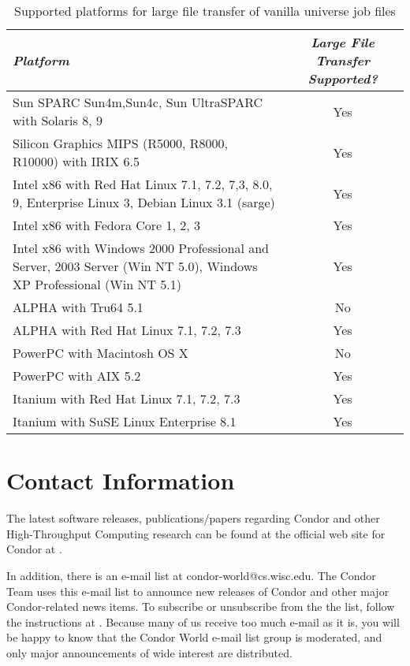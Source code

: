 \begin{center}
\begin{table}[hbt]
\begin{tabular}{|lc|} \hline
\emph{Platform} & \emph{Large File Transfer Supported?} \\ \hline \hline
Sun SPARC Sun4m,Sun4c, Sun UltraSPARC with Solaris 8, 9 & Yes \\ \hline
Silicon Graphics MIPS (R5000, R8000, R10000) with IRIX 6.5 &  Yes \\ \hline
Intel x86 with Red Hat Linux 7.1, 7.2, 7,3, 8.0, 9, Enterprise Linux 3, Debian Linux 3.1 (sarge) & Yes \\ 
Intel x86 with Fedora Core 1, 2, 3 & Yes \\
Intel x86 with Windows 2000 Professional and Server, 2003 Server (Win NT 5.0), Windows XP Professional (Win NT 5.1) & Yes \\ \hline
ALPHA with  Tru64 5.1  & No \\ 
ALPHA with Red Hat Linux 7.1, 7.2, 7.3 & Yes \\ \hline
PowerPC with Macintosh OS X  & No \\
PowerPC with AIX 5.2  & Yes \\ \hline
Itanium with Red Hat Linux 7.1, 7.2, 7.3 & Yes \\
Itanium with SuSE Linux Enterprise 8.1 & Yes \\ \hline
\end{tabular}
\caption{\label{large-file-support}Supported platforms for large file transfer of vanilla universe job files}
\end{table}
\end{center}


\section{\label{contact-info}Contact Information}

The latest software releases, publications/papers regarding Condor and other 
High-Throughput Computing
research can be found at the official web site for Condor at  
.

In addition, there is an e-mail list at condor-world@cs.wisc.edu.
The Condor Team uses this e-mail list to announce new releases of
Condor and other major Condor-related news items.
To subscribe or unsubscribe from the the list, follow the instructions at  
.
Because many of us receive 
too much e-mail as it is, you will be happy to know that the
Condor World e-mail list group is 
moderated, and only major announcements of wide interest are distributed.


